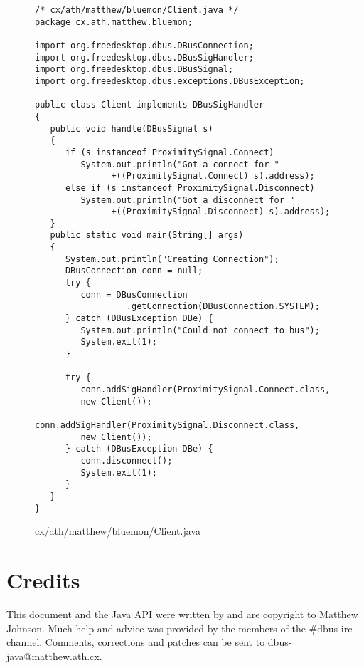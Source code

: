 \documentclass[a4paper,12pt]{article}
\begin{document}
\begin{figure}[!h]
\begin{center}
\begin{verbatim}
/* cx/ath/matthew/bluemon/Client.java */
package cx.ath.matthew.bluemon;

import org.freedesktop.dbus.DBusConnection;
import org.freedesktop.dbus.DBusSigHandler;
import org.freedesktop.dbus.DBusSignal;
import org.freedesktop.dbus.exceptions.DBusException;

public class Client implements DBusSigHandler
{
   public void handle(DBusSignal s)
   {
      if (s instanceof ProximitySignal.Connect)
         System.out.println("Got a connect for "
               +((ProximitySignal.Connect) s).address);
      else if (s instanceof ProximitySignal.Disconnect)
         System.out.println("Got a disconnect for "
               +((ProximitySignal.Disconnect) s).address);
   }
   public static void main(String[] args) 
   {
      System.out.println("Creating Connection");
      DBusConnection conn = null;
      try {
         conn = DBusConnection
                  .getConnection(DBusConnection.SYSTEM);
      } catch (DBusException DBe) {
         System.out.println("Could not connect to bus");
         System.exit(1);
      }
      
      try {
         conn.addSigHandler(ProximitySignal.Connect.class, 
         new Client());
         conn.addSigHandler(ProximitySignal.Disconnect.class, 
         new Client());
      } catch (DBusException DBe) {
         conn.disconnect();
         System.exit(1);
      }
   }
}
\end{verbatim}
\end{center}
\caption{cx/ath/matthew/bluemon/Client.java}
\end{figure}

\newpage

\section{Credits}

This document and the Java API were written by and are copyright to
Matthew Johnson. Much help and advice was provided by the members of
the \#dbus irc channel. Comments, corrections and patches can be sent
to dbus-java@matthew.ath.cx.
\end{document}
